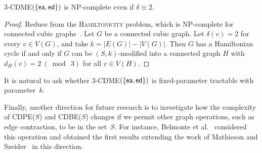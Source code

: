 \documentclass[11pt]{llncs}
\newcommand{\ed}{{\sf ed}}
\newcommand{\ea}{{\sf ea}}
\newcommand{\cdpe}{{\sc CDPE}}
\newcommand{\cdbe}{{\sc CDBE}}
\newcommand{\NP}{{\sf NP}}
\begin{document}
\begin{theorem}\label{thm:mod-3}
$3$-\textsc{CDME}$(\{\ea,\ed\})$ is \NP-complete even if $\delta\equiv 2$.
\end{theorem}

\begin{proof}
Reduce from the \textsc{Hamiltonicity} problem, which is \NP-complete for
connected cubic graphs~\cite{GareyJ79}.  Let $G$ be a connected cubic graph.
Let $\delta(v)=2$ for every $v\in V(G)$, and take $k=|E(G)|-|V(G)|$.  Then $G$
has a Hamiltonian cycle if and only if $G$ can be $(S,k)$-modified into a
connected graph $H$ with $d_H(v)=2~(\bmod~3)$ for all $v\in V(H)$.
\end{proof}

\begin{sloppypar}
It is natural to ask whether
$3$-\textsc{CDME}$(\{\ea,\ed\})$ is fixed-parameter tractable with parameter~$k$.
\end{sloppypar}

Finally, another direction for future research is to investigate how the complexity of  \cdpe($S$) and \cdbe($S$) changes
if we permit other graph operations, such as edge contraction, to be in the set~$S$.
For instance, Belmonte et al.~\cite{BGHP14} considered this operation and
obtained the first results extending the work of Mathieson and Szeider~\cite{MathiesonS12} in this direction.


\end{document}
